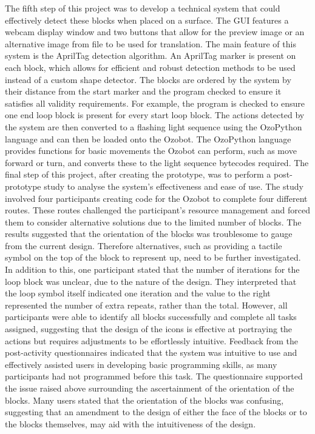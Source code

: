 \documentclass[oneside,%
                    author={Malak Hajji},
                    degree={BSc},
                    title={Designing An Accessible Computational Toolkit For Students},
                  subtitle={With Mixed Visual Abilities}]{dissertation}
\begin{document}
The fifth step of this project was to develop a technical system that could effectively detect these blocks when placed on a surface. The GUI features a webcam display window and two buttons that allow for the preview image or an alternative image from file to be used for translation. The main feature of this system is the AprilTag detection algorithm. An AprilTag marker is present on each block, which allows for efficient and robust detection methods to be used instead of a custom shape detector. The blocks are ordered by the system by their distance from the start marker and the program checked to ensure it satisfies all validity requirements. For example, the program is checked to ensure one end loop block is present for every start loop block. The actions detected by the system are then converted to a flashing light sequence using the OzoPython language and can then be loaded onto the Ozobot. The OzoPython language provides functions for basic movements the Ozobot can perform, such as move forward or turn, and converts these to the light sequence bytecodes required.
The final step of this project, after creating the prototype, was to perform a post-prototype study to analyse the system’s effectiveness and ease of use. The study involved four participants creating code for the Ozobot to complete four different routes. These routes challenged the participant’s resource management and forced them to consider alternative solutions due to the limited number of blocks. The results suggested that the orientation of the blocks was troublesome to gauge from the current design. Therefore alternatives, such as providing a tactile symbol on the top of the block to represent up, need to be further investigated. In addition to this, one participant stated that the number of iterations for the loop block was unclear, due to the nature of the design. They interpreted that the loop symbol itself indicated one iteration and the value to the right represented the number of extra repeats, rather than the total. However, all participants were able to identify all blocks successfully and complete all tasks assigned, suggesting that the design of the icons is effective at portraying the actions but requires adjustments to be effortlessly intuitive. Feedback from the post-activity questionnaires indicated that the system was intuitive to use and effectively assisted users in developing basic programming skills, as many participants had not programmed before this task. The questionnaire supported the issue raised above surrounding the ascertainment of the orientation of the blocks. Many users stated that the orientation of the blocks was confusing, suggesting that an amendment to the design of either the face of the blocks or to the blocks themselves, may aid with the intuitiveness of the design.
\end{document}
